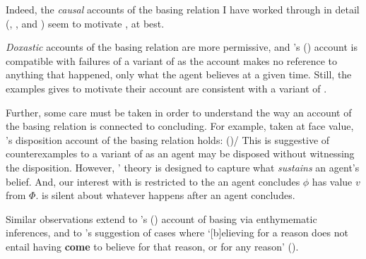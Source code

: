 \begin{note}
{    Indeed, the \emph{causal} accounts of the basing relation I have worked through in detail (\cite{Moser:1989tv}, \cite{Ye:2020ux}, and \cite{Turri:2011aa}) seem to motivate \issueInclusion{}, at best.

    \emph{Doxastic} accounts of the basing relation are more permissive, and \citeauthor{Tolliver:1982us}'s (\citeyear{Tolliver:1982us}) account is compatible with failures of a variant of \issueInclusion{} as the account makes no reference to anything that happened, only what the agent believes at a given time.
    Still, the examples \citeauthor{Tolliver:1982us} gives to motivate their account are consistent with a variant of \issueInclusion{}.

    Further, some care must be taken in order to understand the way an account of the basing relation is connected to concluding.
    For example, taken at face value, \citeauthor{Evans:2013tw}'s disposition account of the basing relation holds:
     (\citeyear[2952]{Evans:2013tw})/
  This is suggestive of counterexamples to a variant of \issueInclusion{} as an agent may be disposed without witnessing the disposition.
  However, \citeauthor{Evans:2013tw}' theory is designed to capture what \emph{sustains} an agent's belief.%
  And, our interest with \issueInclusion{} is restricted to the  an agent concludes \(\phi\) has value \(v\) from \(\Phi\).
  \issueInclusion{} is silent about whatever happens after an agent concludes.

  Similar observations extend to \citeauthor{Moretti:2019wx}'s (\citeyear{Moretti:2019wx}) account of basing via enthymematic inferences, and to  \citeauthor{Audi:1986to}'s suggestion of cases where `[b]elieving for a reason does not entail having \textbf{come} to believe for that reason, or for any reason' (\citeyear[32--33]{Audi:1986to}).
  }
\end{note}


